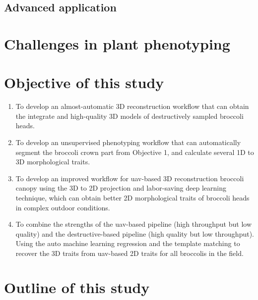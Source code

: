 


\subsection{Advanced application}


\section{Challenges in plant phenotyping}


\section{Objective of this study}

\begin{enumerate}
    \item To develop an almost-automatic 3D reconstruction workflow that can obtain the integrate and high-quality 3D models of destructively sampled broccoli heads.
    \item To develop an unsupervised phenotyping workflow that can automatically segment the broccoli crown part from Objective 1, and calculate several 1D to 3D morphological traits.
    \item To develop an improved workflow for \gls{uav}-based 3D reconstruction broccoli canopy using the 3D to 2D projection and labor-saving deep learning technique, which can obtain better 2D morphological traits of broccoli heads in complex outdoor conditions.
    \item To combine the strengths of the \gls{uav}-based pipeline (high throughput but low quality) and the destructive-based pipeline (high quality but low throughput). Using the auto machine learning regression and the template matching to recover the 3D traits from \gls{uav}-based 2D traits for all broccolis in the field.

\end{enumerate}


\section{Outline of this study}

